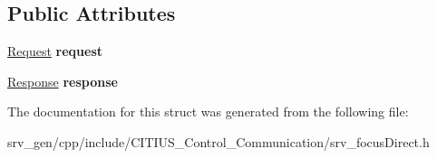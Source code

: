 \subsection*{\-Public \-Attributes}
\begin{DoxyCompactItemize}
\item 
\hypertarget{struct_c_i_t_i_u_s___control___communication_1_1srv__focus_direct_aac256a8e6b8c1376e0c95ccb453e7357}{\hyperlink{struct_c_i_t_i_u_s___control___communication_1_1srv__focus_direct_request__}{\-Request} {\bfseries request}}\label{struct_c_i_t_i_u_s___control___communication_1_1srv__focus_direct_aac256a8e6b8c1376e0c95ccb453e7357}

\item 
\hypertarget{struct_c_i_t_i_u_s___control___communication_1_1srv__focus_direct_a0e3fb7441869eea83f60451ef1e085f0}{\hyperlink{struct_c_i_t_i_u_s___control___communication_1_1srv__focus_direct_response__}{\-Response} {\bfseries response}}\label{struct_c_i_t_i_u_s___control___communication_1_1srv__focus_direct_a0e3fb7441869eea83f60451ef1e085f0}

\end{DoxyCompactItemize}


\-The documentation for this struct was generated from the following file\-:\begin{DoxyCompactItemize}
\item 
srv\-\_\-gen/cpp/include/\-C\-I\-T\-I\-U\-S\-\_\-\-Control\-\_\-\-Communication/srv\-\_\-focus\-Direct.\-h\end{DoxyCompactItemize}
